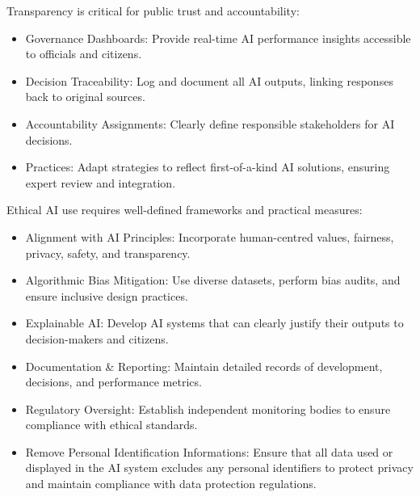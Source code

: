 
Transparency is critical for public trust and accountability:

\begin{itemize}

\item Governance Dashboards: Provide real-time AI performance insights accessible to officials and citizens.

\item Decision Traceability: Log and document all AI outputs, linking responses back to original sources.

\item Accountability Assignments: Clearly define responsible stakeholders for AI decisions.

\item Practices: Adapt strategies to reflect first-of-a-kind AI solutions, ensuring expert review and integration.

\end{itemize}


Ethical AI use requires well-defined frameworks and practical measures:

\begin{itemize}

\item Alignment with AI Principles: Incorporate human-centred values, fairness, privacy, safety, and transparency.

\item Algorithmic Bias Mitigation: Use diverse datasets, perform bias audits, and ensure inclusive design practices.

\item Explainable AI: Develop AI systems that can clearly justify their outputs to decision-makers and citizens.

\item Documentation \& Reporting: Maintain detailed records of development, decisions, and performance metrics.

\item Regulatory Oversight: Establish independent monitoring bodies to ensure compliance with ethical standards.

\item Remove Personal Identification Informations: Ensure that all data used or displayed in the AI system excludes any personal identifiers to protect privacy and maintain compliance with data protection regulations.

\end{itemize}

